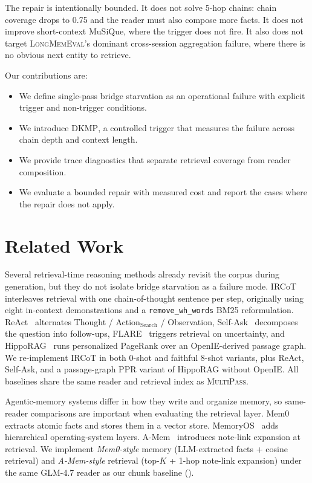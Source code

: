 \documentclass{article}
\theoremstyle{plain}
\theoremstyle{definition}
\newcommand{\ours}{\textsc{MultiPass}}
\newcommand{\dkmp}{\textsc{DKMP}}
\newcommand{\lm}{\textsc{LongMemEval}}
\begin{document}
The repair is intentionally bounded. It does not solve 5-hop chains: chain
coverage drops to 0.75 and the reader must also compose more facts. It
does not improve short-context MuSiQue, where the trigger does not fire.
It also does not target \lm{}'s dominant cross-session aggregation
failure, where there is no obvious next entity to retrieve.

Our contributions are:
\begin{itemize}\setlength{\itemsep}{0.05em}
  \item We define single-pass bridge starvation as an operational failure
        with explicit trigger and non-trigger conditions.
  \item We introduce \dkmp{}, a controlled trigger that measures the
        failure across chain depth and context length.
  \item We provide trace diagnostics that separate retrieval coverage from
        reader composition.
  \item We evaluate a bounded repair with measured cost and report the
        cases where the repair does not apply.
\end{itemize}

\section{Related Work}\label{sec:related}

Several retrieval-time reasoning methods already revisit the corpus
during generation, but they do not isolate bridge starvation as a failure
mode. IRCoT~\cite{trivedi2023ircot} interleaves retrieval with one
chain-of-thought sentence per step, originally using eight in-context
demonstrations and a \texttt{remove\_wh\_words} BM25 reformulation.
ReAct~\cite{yao2023react} alternates Thought / Action$_\text{Search}$ /
Observation, Self-Ask~\cite{press2023selfask} decomposes the question into
follow-ups, FLARE~\cite{jiang2023flare} triggers retrieval on uncertainty,
and HippoRAG~\cite{gutierrez2024hipporag} runs personalized PageRank over
an OpenIE-derived passage graph. We re-implement IRCoT in both 0-shot and
faithful 8-shot variants, plus ReAct, Self-Ask, and a passage-graph PPR
variant of HippoRAG without OpenIE. All baselines share the same reader and
retrieval index as \ours{}.

Agentic-memory systems differ in how they write and organize memory, so
same-reader comparisons are important when evaluating the retrieval layer.
Mem0~\cite{mem0blog2026} extracts atomic facts and stores them in a vector
store. MemoryOS~\cite{memoryos2025emnlp} adds hierarchical
operating-system layers. A-Mem~\cite{xu2025amem} introduces note-link
expansion at retrieval. We implement \emph{Mem0-style} memory
(LLM-extracted facts + cosine retrieval) and \emph{A-Mem-style} retrieval
(top-$K$ + 1-hop note-link expansion) under the same GLM-4.7 reader as our
chunk baseline ().
\end{document}
